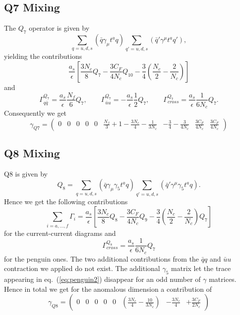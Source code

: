 	\subsection*{Q7 Mixing}
	The $Q_7$ operator is given by
	\begin{equation}
		\sum_{q=u,d,s} ( \bar q \gamma_\mu t^a q ) \sum_{q'=u,d,s} (\bar q' \gamma^\mu t^a q'),
	\end{equation}
	yielding the contributions
	\begin{equation}
	\frac{a_s}{\epsilon} \left[\frac{3N_c}{8}Q_7 - \frac{3C_F}{4N_c}Q_{10} - \frac{3}{4}\left(\frac{N_c}{2}-\frac{2}{N_c}\right)\right]
	\end{equation}
	and
	\begin{equation}
		\Gamma^{Q_7}_{q\bar q} = \frac{a_s}{\epsilon}\frac{N_f}{6}Q_7, \qquad \Gamma^{Q_7}_{\bar uu} = -\frac{a_s}{\epsilon} \frac{1}{2} Q_7, \qquad \Gamma^{Q_7}_{cross} = \frac{a_s}{\epsilon} \frac{1}{6N_c} Q_7.
	\end{equation}
	Consequently we get
	\begin{equation}
		\gamma_{Q7} = 
		\begin{pmatrix}
			0 & 0 & 0 & 0 & 0 & \frac{N_f}{3}+1-\frac{3N_c}{4}-\frac{1}{3N_c} & -\frac{3}{4}-\frac{3}{4N_c} & \frac{3C_F}{4N_c} & \frac{3C_F}{4N_c}
		\end{pmatrix}
	\end{equation}
	
	\subsection*{Q8 Mixing}
	Q8 is given by
	\begin{equation}
		Q_8 = \sum_{q=u,d,s}(\bar q \gamma_\mu \gamma_5 t^a q) \sum_{q'=u,d,s} (\bar q' \gamma^\mu \gamma_5 t^a q).
	\end{equation}
	Hence we get the following contributions
	\begin{equation}
		\sum_{i=a,\ldots,f} \Gamma_i = \frac{a_s}{\epsilon} \left[ \frac{3N_c}{8}Q_8 - \frac{3C_F}{4N_c}Q_9 - \frac{3}{4}\left(\frac{N_c}{2}-\frac{2}{N_c}\right)Q_7 \right]
	\end{equation}
	for the current-current diagrams and
	\begin{equation}
		\Gamma^{Q_8}_{cross} = \frac{a_s}{\epsilon} \frac{1}{6N_c}Q_7
	\end{equation}
	for the penguin ones. The two additional contributions from the $\bar qq$ and $\bar uu$ contraction we applied do not exist. The additional $\gamma_5$ matrix let the trace appearing in eq.~(\ref{eq:penguin2}) disappear for an odd number of $\gamma$ matrices. Hence in total we get for the anomalous dimension a contribution of
	\begin{equation}
		\gamma_{Q8} = 
		\begin{pmatrix}
			0 & 0 & 0 & 0 & 0 & \left(\frac{3N_c}{4}-\frac{10}{3N_c}\right) & -\frac{3N_c}{4} & + \frac{3C_F}{2N_c} 			
		\end{pmatrix}
	\end{equation}

